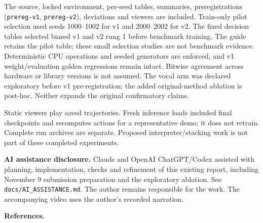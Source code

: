 The source, locked environment, per-seed tables, summaries,
preregistrations (\texttt{prereg-v1}, \texttt{prereg-v2}), deviations
and viewers are included. Train-only pilot selection used seeds
1000--1002 for v1 and 2000--2002 for v2. The fixed decision tables
selected biased v1 and v2 rung 1 before benchmark training. The guide
retains the pilot table; these small selection studies are not benchmark
evidence. Deterministic CPU operations and seeded generators are
enforced, and v1 weight/evaluation golden regressions remain intact.
Bitwise agreement across hardware or library versions is not assumed.
The vocal arm was declared exploratory before v1 pre-registration; the
added original-method ablation is post-hoc. Neither expands the original
confirmatory claims.

Static viewers play saved trajectories. Fresh inference loads included
final checkpoints and recomputes actions for a representative demo; it
does not retrain. Complete run archives are separate. Proposed
interpreter/stacking work is not part of these completed experiments.

\textbf{AI assistance disclosure.} Claude and OpenAI ChatGPT/Codex
assisted with planning, implementation, checks and refinement of this
existing report, including November 9 submission preparation and the
exploratory ablation. See \texttt{docs/AI\_ASSISTANCE.md}. The author
remains responsible for the work. The accompanying video uses the
author's recorded narration.

\textbf{References.}

